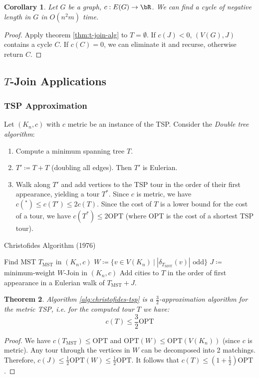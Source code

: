 \documentclass[11pt, a4paper]{article}
\newcommand{\abs}[1]{\left\lvert#1\right\rvert}
\newcommand{\set}[1]{\{#1\}}
\newtheorem{theorem}{Theorem}[section]
\newtheorem{cor}[theorem]{Corollary}
\theoremstyle{remark}
\theoremstyle{definition}
\begin{document}
\begin{cor}
	Let $G$ be a graph, $c: E(G)\to\bR$. We can find a cycle of negative length
	in $G$ in $O(n^2m)$ time.
\end{cor}
\begin{proof}
	Apply theorem \ref{thm:t-join-alg} to $T=\emptyset$. If $c(J)<0$,
	$(V(G),J)$ contains a cycle $C$. If $c(C)=0$, we can eliminate it and
	recurse, otherwise return $C$.
\end{proof}

\subsection{\texorpdfstring{$T$}{T}-Join Applications}
\subsubsection{TSP Approximation}
Let $(K_n,c)$ with $c$ metric be an instance of the TSP. Consider the
\emph{Double tree algorithm}:
\begin{enumerate}
	\item Compute a minimum spanning tree $T$.
	\item $T'\coloneqq T+T$ (doubling all edges). Then $T'$ is Eulerian.
	\item Walk along $T'$ and add vertices to the TSP tour in the order of
	their first appearance, yielding a tour $T^*$. Since $c$ is metric,
	we have $c(^*)\leq c(T')\leq 2c(T)$. Since the cost of $T$ is a lower
	bound for the cost of a tour, we have $c(T^*)\leq 2\mathrm{OPT}$
	(where OPT is the cost of a shortest TSP tour).
\end{enumerate}

\begin{algorithm}[htbp]
	\caption{Christofides Algorithm (1976)}\label{alg:christofides-tsp}
	Find MST $T_{\mathrm{MST}}$ in $(K_n,c)$\;
	$W\coloneqq \set{v\in V(K_n)\ |\ \abs{\delta_{T_{\mathrm{MST}}}(v)}\text{ odd}}$\;
	$J\coloneqq$ minimum-weight $W$-Join  in $(K_n,c)$\;
	Add cities to $T$ in the order of first appearance in a Eulerian walk of
	$T_{\mathrm{MST}}+J$.\;
\end{algorithm}

\begin{theorem}
	Algorithm \ref{alg:christofides-tsp} is a $\frac{3}{2}$-approximation
	algorithm for the metric TSP, i.e. for the computed tour $T$ we have:
	\[c(T)\leq \frac{3}{2}\mathrm{OPT}\]
\end{theorem}
\begin{proof}
	We have $c(T_{\mathrm{MST}})\leq \mathrm{OPT}$ and $\mathrm{OPT}(W)\leq
		\mathrm{OPT}(V(K_n))$ (since $c$ is metric). Any tour through the vertices
	in $W$ can be decomposed into 2 matchings. Therefore,
	$c(J)\leq\frac{1}{2}\mathrm{OPT}(W)\leq\frac{1}{2}\mathrm{OPT}$. It
	follows that $c(T)\leq (1+\frac{1}{2})\mathrm{OPT}$.
\end{proof}
\end{document}
